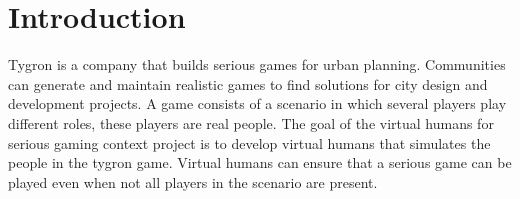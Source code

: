 \section{Introduction}
Tygron is a company that builds serious games for urban planning. Communities can generate and maintain realistic games to find solutions for city design and development projects. A game consists of a scenario in which several players play different roles, these players are real people. The goal of the virtual humans for serious gaming context project is to develop virtual humans that simulates the people in the tygron game. Virtual humans can ensure that a serious game can be played even when not all players in the scenario are present.